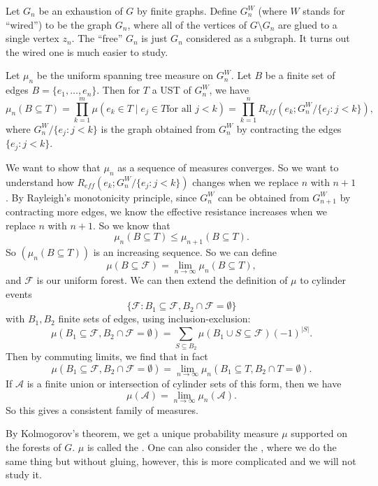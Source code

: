 \documentclass[a4paper]{article}
\begin{document}
Let $G_n$ be an exhaustion of $G$ by finite graphs. Define $G_n^W$ (where $W$ stands for ``wired'') to be the graph $G_n$, where all of the vertices of $G \setminus G_n$ are glued to a single vertex $z_n$. The ``free'' $G_n$ is just $G_n$ considered as a subgraph. It turns out the wired one is much easier to study.

Let $\mu_n$ be the uniform spanning tree measure on $G_n^W$. Let $B$ be a finite set of edges $B = \{e_1, \ldots, e_n\}$. Then for $T$ a UST of $G_n^W$, we have
\[
  \mu_n(B \subseteq T) = \prod_{k = 1}^m \mu(e_k \in T \mid e_j \in T\text{for all }j < k) = \prod_{k = 1}^n R_{eff}(e_k; G_n^W/\{e_j: j < k\}),
\]
where $G_n^W/\{e_j: j < k\}$ is the graph obtained from $G_n^W$ by contracting the edges $\{e_j: j < k\}$.

We want to show that $\mu_n$ as a sequence of measures converges. So we want to understand how $R_{eff}(e_k; G_n^W/\{e_j: j < k\})$ changes when we replace $n$ with $n + 1$. By Rayleigh's monotonicity principle, since $G_n^W$ can be obtained from $G_{n + 1}^W$ by contracting more edges, we know the effective resistance increases when we replace $n$ with $n + 1$. So we know that
\[
  \mu_n(B \subseteq T) \leq \mu_{n + 1}(B \subseteq T).
\]
So $(\mu_n(B \subseteq T))$ is an increasing sequence. So we can define
\[
  \mu(B \subseteq \mathcal{F}) = \lim_{n \to \infty} \mu_n(B \subseteq T),
\]
and $\mathcal{F}$ is our uniform forest. We can then extend the definition of $\mu$ to cylinder events
\[
  \{\mathcal{F}: B_1 \subseteq \mathcal{F}, B_2 \cap \mathcal{F} = \emptyset\}
\]
with $B_1, B_2$ finite sets of edges, using inclusion-exclusion:
\[
  \mu(B_1 \subseteq \mathcal{F}, B_2 \cap \mathcal{F} = \emptyset) = \sum_{S \subseteq B_2} \mu(B_1 \cup S \subseteq \mathcal{F}) (-1)^{|S|}.
\]
Then by commuting limits, we find that in fact
\[
  \mu(B_1 \subseteq \mathcal{F}, B_2 \cap \mathcal{F} = \emptyset) = \lim_{n \to \infty} \mu_n (B_1 \subseteq T, B_2 \cap T = \emptyset).
\]
If $\mathcal{A}$ is a finite union or intersection of cylinder sets of this form, then we have
\[
  \mu(\mathcal{A}) = \lim_{n \to \infty} \mu_n(\mathcal{A}).
\]
So this gives a consistent family of measures.

By Kolmogorov's theorem, we get a unique probability measure $\mu$ supported on the forests of $G$. $\mu$ is called the . One can also consider the , where we do the same thing but without gluing, however, this is more complicated and we will not study it.
\end{document}
